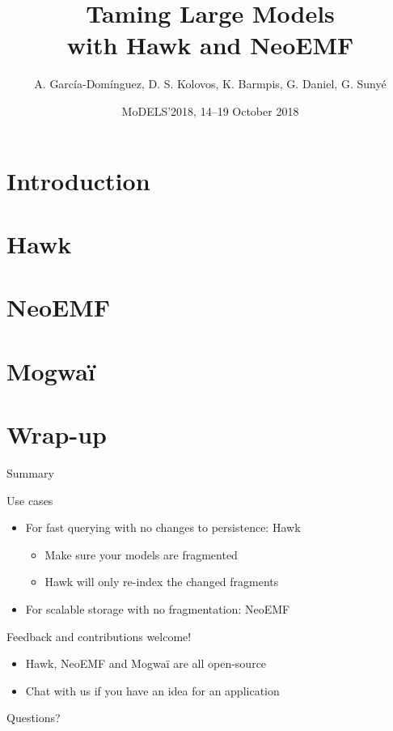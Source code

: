 \documentclass[10pt]{beamer}
\title{Taming Large Models\\with Hawk and NeoEMF}
\date{MoDELS'2018, 14--19 October 2018}
\author{A. García-Domínguez, D. S. Kolovos, K. Barmpis, G. Daniel, G. Sunyé}
\begin{document}
\maketitle

\section{Introduction}
\section{Hawk}
\section{NeoEMF}
\section{Mogwa\"i}

\section{Wrap-up}

\begin{frame}{Summary}

  \begin{block}{Use cases}
    \begin{itemize}
    \item For fast querying with no changes to persistence: Hawk
    \begin{itemize}
    \item Make sure your models are fragmented
    \item Hawk will only re-index the changed fragments
    \end{itemize}
    \item For scalable storage with no fragmentation: NeoEMF
    \end{itemize}
  \end{block}

  \begin{block}{Feedback and contributions welcome!}
  \begin{itemize}
  \item Hawk, NeoEMF and Mogwaï are all open-source
  \item Chat with us if you have an idea for an application
  \end{itemize}
  \end{block}

\end{frame}

\appendix

{
\begin{frame}[standout]
  Questions?
\end{frame}
}

\end{document}

